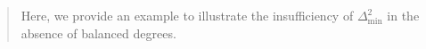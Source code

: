 \documentclass[11pt]{article}
\theoremstyle{definition}
\theoremstyle{definition}
\begin{document}
\begin{enumerate}[wide, labelwidth=!, labelindent=0pt]
\begin{enumerate}
\begin{quote}

Here, we provide an example to illustrate the insufficiency of $\Delta_{\min}^2$ in the absence of balanced degrees. 




\end{quote}
\end{enumerate}
\end{enumerate}
\end{document}
